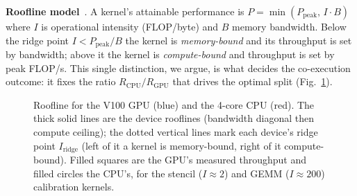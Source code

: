 \documentclass[conference]{IEEEtran}
\begin{document}
\textbf{Roofline model}~\cite{roofline}. A kernel's attainable performance is
$P=\min(P_\mathrm{peak},\,I\cdot B)$ where $I$ is operational intensity (FLOP/byte) and
$B$ memory bandwidth. Below the ridge point $I<P_\mathrm{peak}/B$ the kernel is
\emph{memory-bound} and its throughput is set by bandwidth; above it the kernel is
\emph{compute-bound} and throughput is set by peak FLOP/s. This single distinction, we
argue, is what decides the co-execution outcome: it fixes the ratio
$R_\mathrm{CPU}/R_\mathrm{GPU}$ that drives the optimal split (Fig.~\ref{fig:roofline}).

\begin{figure}[t]
\centering
{}
\caption{Roofline for the V100 GPU (blue) and the 4-core CPU (red). The thick solid lines
are the device rooflines (bandwidth diagonal then compute ceiling); the dotted vertical
lines mark each device's ridge point $I_\mathrm{ridge}$ (left of it a kernel is
memory-bound, right of it compute-bound). Filled squares are the GPU's measured throughput
and filled circles the CPU's, for the stencil ($I{\approx}2$) and GEMM ($I{\approx}200$)
calibration kernels.}
\label{fig:roofline}
\end{figure}
\end{document}

